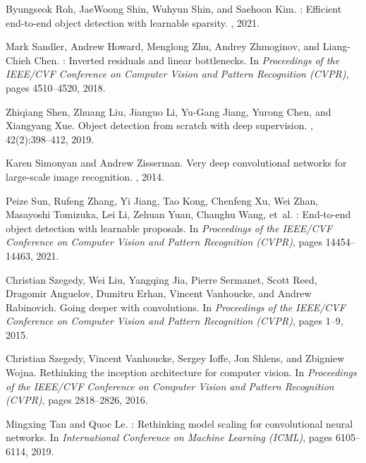 \documentclass[10pt,twocolumn,letterpaper]{article}
\begin{document}
{\begin{thebibliography}{100}
				Byungseok Roh, JaeWoong Shin, Wuhyun Shin, and Saehoon Kim.
				: Efficient end-to-end object detection with learnable
				sparsity.
				, 2021.
				
				Mark Sandler, Andrew Howard, Menglong Zhu, Andrey Zhmoginov, and Liang-Chieh
				Chen.
				: Inverted residuals and linear bottlenecks.
				\newblock In {\em Proceedings of the IEEE/CVF Conference on Computer Vision and
					Pattern Recognition (CVPR)}, pages 4510--4520, 2018.
				
				Zhiqiang Shen, Zhuang Liu, Jianguo Li, Yu-Gang Jiang, Yurong Chen, and
				Xiangyang Xue.
				\newblock Object detection from scratch with deep supervision.
				, 42(2):398--412, 2019.
				
				Karen Simonyan and Andrew Zisserman.
				\newblock Very deep convolutional networks for large-scale image recognition.
				, 2014.
				
				Peize Sun, Rufeng Zhang, Yi Jiang, Tao Kong, Chenfeng Xu, Wei Zhan, Masayoshi
				Tomizuka, Lei Li, Zehuan Yuan, Changhu Wang, et~al.
				: End-to-end object detection with learnable proposals.
				\newblock In {\em Proceedings of the IEEE/CVF Conference on Computer Vision and
					Pattern Recognition (CVPR)}, pages 14454--14463, 2021.
				
				Christian Szegedy, Wei Liu, Yangqing Jia, Pierre Sermanet, Scott Reed, Dragomir
				Anguelov, Dumitru Erhan, Vincent Vanhoucke, and Andrew Rabinovich.
				\newblock Going deeper with convolutions.
				\newblock In {\em Proceedings of the IEEE/CVF Conference on Computer Vision and
					Pattern Recognition (CVPR)}, pages 1--9, 2015.
				
				Christian Szegedy, Vincent Vanhoucke, Sergey Ioffe, Jon Shlens, and Zbigniew
				Wojna.
				\newblock Rethinking the inception architecture for computer vision.
				\newblock In {\em Proceedings of the IEEE/CVF Conference on Computer Vision and
					Pattern Recognition (CVPR)}, pages 2818--2826, 2016.
				
				Mingxing Tan and Quoc Le.
				: Rethinking model scaling for convolutional neural
				networks.
				\newblock In {\em International Conference on Machine Learning (ICML)}, pages
				6105--6114, 2019.
				

\end{thebibliography}}
\end{document}
